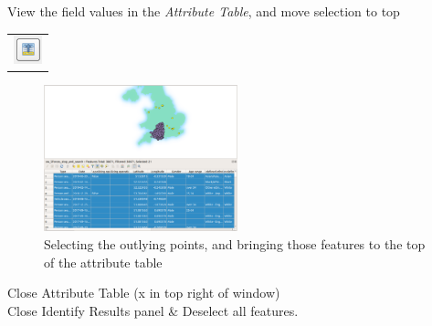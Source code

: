 View the field values in the \textit{Attribute Table}, and move selection to top
\begin{tabular}{@{}c@{}}\includegraphics[width=4ex]{images/move_selection_to_top_icon.png}\end{tabular}


\begin{figure}[!h]
	\centering
	\includegraphics[width=0.5\textwidth]{images/stop_search_select_features.png}
	\caption{Selecting the outlying points, and bringing those features to the top of the attribute table}
	\label{ft_fig_firstfig3}
\end{figure}
\null\newpage

Close Attribute Table (x in top right of window)\\
Close Identify Results panel \& Deselect all features.\\


%
%
%
%
%
%
%

